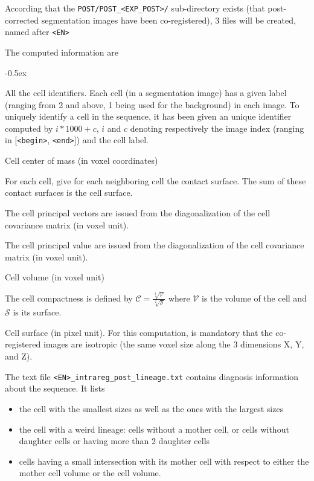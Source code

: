 According that the \texttt{POST/POST\_<EXP\_POST>/} sub-directory exists (that post-corrected segmentation images have been co-registered), 3 files will be created, named after \texttt{<EN>}

\mbox{}

The computed information are
\begin{description}
  \itemsep -0.5ex
\item[\texttt{all\_cells}] All the cell identifiers. Each cell (in a segmentation image) has a given label (ranging from 2 and above, 1 being used for the background) in each image. To uniquely identify a cell in the sequence, it has been given an unique identifier computed by $i * 1000 + c$, $i$ and $c$ denoting respectively the image index (ranging in [\texttt{<begin>}, \texttt{<end>}]) and the cell label.
\item[\texttt{cell\_barycenter}] Cell center of mass (in voxel coordinates)
\item[\texttt{cell\_contact\_surface}] For each cell, give for each neighboring cell the contact surface. The sum of these contact surfaces is the cell surface.
\item[\texttt{cell\_principal\_vectors}] The cell principal vectors are issued from the diagonalization of the cell covariance matrix (in voxel unit).
\item[\texttt{cell\_principal\_values}] The cell principal value are issued from the diagonalization of the cell covariance matrix (in voxel unit).
\item[\texttt{cell\_volume}] Cell volume (in voxel unit)
\item[\texttt{cell\_compactness}] The cell compactness is defined by $\mathcal{C} =\frac{\sqrt[3]{\mathcal{V}}}{\sqrt[2]{\mathcal{S}}}$ where $\mathcal{V}$ is the volume of the cell and $\mathcal{S}$ is its surface.
\item[\texttt{cell\_surface}] Cell surface (in pixel unit). For this computation, is mandatory that the co-registered images are isotropic (the same voxel size along the 3 dimensions X, Y, and Z).
\item[\texttt{cell\_lineage}]
\end{description}

The text file \texttt{<EN>\_intrareg\_post\_lineage.txt} contains diagnosis information about the sequence. It lists
\begin{itemize}
  \itemsep -0.5ex
\item the cell with the smallest sizes as well as the ones with the largest sizes
\item the cell with a weird lineage: cells without a mother cell, or cells without daughter cells or having more than 2 daughter cells
\item cells having a small intersection with its mother cell with respect to either the mother cell volume or the cell volume. 
\end{itemize}

